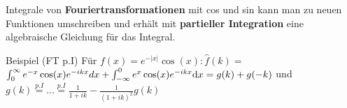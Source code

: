 Integrale von \textbf{Fouriertransformationen} mit cos und sin kann man zu neuen Funktionen umschreiben und erhält mit \textbf{partieller Integration} eine algebraische Gleichung für das Integral.
\begin{namedtheorem}{Beispiel (FT p.I)}
Für $f(x) = e^{-\vert x \vert}\cos(x): \hat{f}(k) =$ $ \int_0^\infty e^{-x}\cos(x)e^{-ikx}dx + \int_{-\infty}^0 e^x\cos(x)e^{-ikx}\mathrm{d}x = g(k) + g(-k)$ und $g(k) \overset{p.I}{=}... \overset{p.I}{=}\frac{1}{1 + ik} - \frac{1}{(1 + ik)^2}g(k)$ 
\end{namedtheorem}


